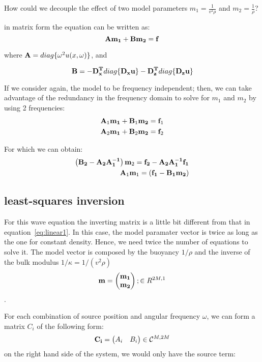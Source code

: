 \documentclass[10pt]{article}
\begin{document}
How could we decouple the effect of two model parameters $m_1 = \frac{1}{v^2\rho}$ and $m_2 = \frac{1}{\rho}$?


in matrix form the equation can be written as:
\begin{equation}
  {\bf A} {\bf m_1} + {\bf B} {\bf m_2} = {\bf f}
\end{equation}

where ${\bf A} = diag\{\omega^2 u(x,\omega)\}$, and 

\begin{equation}
 {\bf B} = -{\bf D_x^T}{ diag\{\bf D_x u\}} - {\bf D_z^T}{ diag\{\bf D_z u\}} 
\end{equation}

If we consider again, the model to be frequency independent; then, we can take advantage of the 
redundancy in the frequency domain to solve for $m_1$ and $m_2$ by using 2 frequencies:
\begin{align}
  {\bf A}_1 {\bf m_1} + {\bf B}_1 {\bf m_2} = {\bf f}_1 \\
  {\bf A}_2 {\bf m_1} + {\bf B}_2 {\bf m_2} = {\bf f}_2
\end{align}

For which we can obtain:
\begin{align}
  \left( {\bf B_2}-{\bf A_2}{\bf A_1^{-1}} \right) {\bf m}_2 = {\bf f_2} -{\bf A_2}{\bf A_1^{-1} f_1} \\
 {\bf A}_1 {\bf m}_1 = ({\bf f_1}-{\bf B_1 m_2}) 
\end{align}




\subsection{least-squares inversion}
  For this wave equation the inverting matrix is a little bit different from that in equation~\ref{eq:linear1}.
In this case, the model paramater vector is twice as long as the one for constant density. Hence, we 
need twice the number of equations to solve it. The model vector is composed by the buoyancy $1/\rho$ and 
the inverse of the bulk modulus $1/\kappa=1/(v^2\rho)$ 
\[
  {\bf m} = 
 \begin{pmatrix}
  {\bf m_1}     \\
  {\bf m_2}   
 \end{pmatrix};
\in R^{2M,1}
\].


For each combination of source position and angular frequency $\omega$, we can form a matrix $C_i$ of the 
following form:
\[
 {\bf C_i } =  
 \begin{pmatrix}
 A_i & B_i 
 \end{pmatrix}  \in \mathcal{C}^{M,2M} 
\]
on the right hand side of the system, we would only have the source term:
\end{document}
